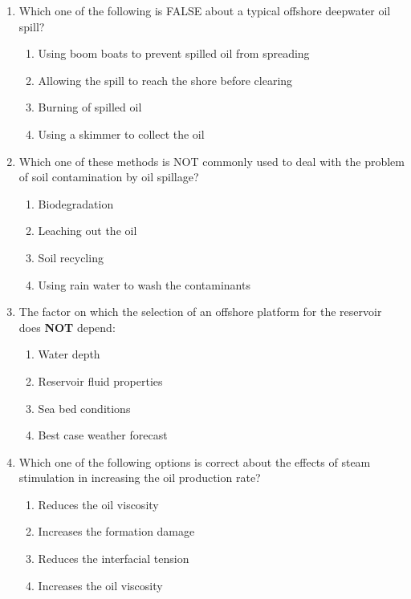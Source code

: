 \documentclass[journal,12pt,onecolumn]{IEEEtran}
\theoremstyle{remark}
\begin{document}
\begin{enumerate}
\pagebreak

\item Which one of the following is FALSE about a typical offshore deepwater oil spill?

\hfill{}

\begin{enumerate}
\item Using boom boats to prevent spilled oil from spreading
\item Allowing the spill to reach the shore before clearing
\item Burning of spilled oil
\item Using a skimmer to collect the oil
\end{enumerate}

\item Which one of these methods is NOT commonly used to deal with the problem of soil
contamination by oil spillage?\hfill{}
\begin{enumerate}
\item Biodegradation
\item Leaching out the oil
\item Soil recycling
\item Using rain water to wash the contaminants
\end{enumerate}

\item The factor on which the selection of an offshore platform for the reservoir does \textbf{NOT}
depend:

\hfill{}

\begin{enumerate}
\item Water depth
\item Reservoir fluid properties
\item Sea bed conditions
\item Best case weather forecast
\end{enumerate}

\item Which one of the following options is correct about the effects of steam stimulation in increasing the oil production rate?

\hfill{}

\begin{enumerate}
\item Reduces the oil viscosity
\item Increases the formation damage
\item Reduces the interfacial tension
\item Increases the oil viscosity
\end{enumerate}


\end{enumerate}
\end{document}

